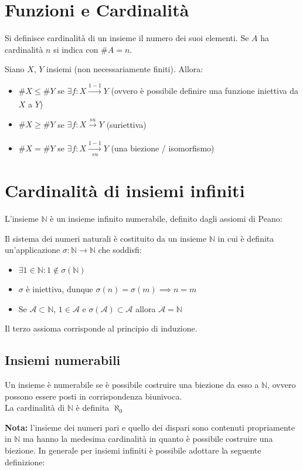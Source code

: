\documentclass[10pt, oneside]{book}
\theoremstyle{plain}
\begin{document}
\section{Funzioni e Cardinalità}
\begin{defin}
    Si definisce cardinalità di un insieme il numero dei suoi elementi. Se $A$ ha cardinalità $n$ si indica con $\# A = n$.
\end{defin}
\begin{prop}
    Siano $X$, $Y$ insiemi (non necessariamente finiti). Allora:
    \begin{itemize}[label = $\square$]
        \item $\#X \leq \#Y$ se $\exists f : X \xrightarrow[]{1-1} Y$ (ovvero è possibile definire una funzione iniettiva da $X$ a $Y$)
        \item $\#X \geq \#Y$ se $\exists f : X \xrightarrow[]{su} Y$ (suriettiva)
        \item $\#X = \#Y$ se $\exists f : X \xrightarrow[su]{1-1} Y$ (una biezione / isomorfismo)
    \end{itemize}
\end{prop}

\section{Cardinalità di insiemi infiniti}
L'insieme $\mathbb{N}$ è un insieme infinito numerabile, definito dagli assiomi di Peano:
\begin{defin}
    Il sistema dei numeri naturali è costituito da un insieme $\mathbb{N}$ in cui è definita un'applicazione $\sigma : \mathbb{N} \rightarrow \mathbb{N}$ che soddisfi:
    \begin{itemize}
        \item $\exists 1 \in \mathbb{N} : 1 \notin \sigma (\mathbb{N})$
        \item $\sigma$ è iniettiva, dunque $\sigma(n) = \sigma(m) \implies n = m$
        \item Se $\mathcal{A} \subset \mathbb{N}$, $1 \in \mathcal{A}$ e $\sigma(\mathcal{A}) \subset \mathcal{A}$ allora $\mathcal{A} = \mathbb{N}$
    \end{itemize}
    Il terzo assioma corrisponde al principio di induzione.
\end{defin}

\subsection{Insiemi numerabili}
\begin{defin}
    Un insieme è numerabile se è possibile costruire una biezione da esso a $\mathbb{N}$, ovvero possono essere posti in corrispondenza biunivoca.
    \\La cardinalità di $\mathbb{N}$ è definita $\aleph_0$
\end{defin}
\textbf{Nota: } l'insieme dei numeri pari e quello dei dispari sono contenuti propriamente in $\mathbb{N}$ ma hanno la medesima cardinalità in quanto è possibile costruire una biezione. In generale per insiemi infiniti è possibile adottare la seguente definizione:
\end{document}
